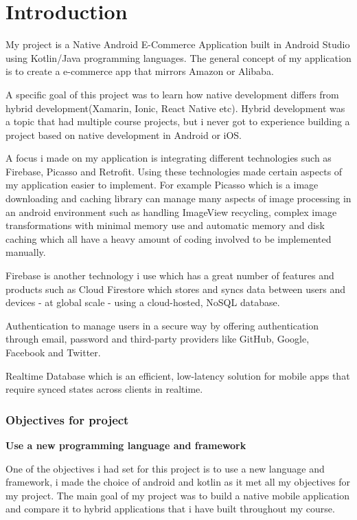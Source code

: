 \chapter{Introduction}
My project is a Native Android E-Commerce Application built in Android Studio using Kotlin/Java programming languages. The general concept of my application is to create a e-commerce app that mirrors Amazon or Alibaba.

A specific goal of this project was to learn how native development differs from hybrid development(Xamarin, Ionic, React Native etc). Hybrid development was a topic that had multiple course projects, but i never got to experience building a project based on native development in Android or iOS.
\newline 

A focus i made on my application is integrating different technologies such as Firebase, Picasso and Retrofit. Using these technologies made certain aspects of my application easier to implement. For example Picasso which is a image downloading and caching library can manage many aspects of image processing in an android environment such as handling ImageView recycling, complex image transformations with minimal memory use and automatic memory and disk caching which all have a heavy amount of coding involved to be implemented manually. \newline

Firebase is another technology i use which has a great number of features and products such as Cloud Firestore which stores and syncs data between users and devices - at global scale - using a cloud-hosted, NoSQL database.

Authentication to manage users in a secure way by offering authentication through email, password and third-party providers like GitHub, Google, Facebook and Twitter.

Realtime Database which is an efficient, low-latency solution for mobile apps that require synced states across clients in realtime.
\newline 



\newpage
\subsection{Objectives for project}

\textbf {Use a new programming language and framework} 

One of the objectives i had set for this project is to use a new language and framework, i made the choice of android and kotlin as it met all my objectives for my project. The main goal of my project was to build a native mobile application and compare it to hybrid applications that i have built throughout my course.\newline

